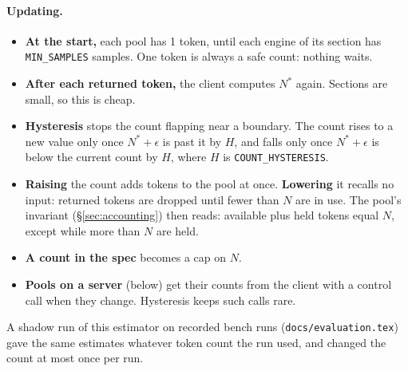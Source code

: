 \documentclass[11pt]{article}
\newcommand{\code}[1]{\texttt{#1}}
\begin{document}
\paragraph{Updating.}
\begin{itemize}[nosep]
  \item \textbf{At the start,} each pool has 1 token, until each engine of
        its section has \code{MIN\_SAMPLES} samples. One token is always a
        safe count: nothing waits.
  \item \textbf{After each returned token,} the client computes $N^*$
        again. Sections are small, so this is cheap.
  \item \textbf{Hysteresis} stops the count flapping near a boundary. The
        count rises to a new value only once $N^* + \epsilon$ is past it by
        $H$, and falls only once $N^* + \epsilon$ is below the current count
        by $H$, where $H$ is \code{COUNT\_HYSTERESIS}.
  \item \textbf{Raising} the count adds tokens to the pool at once.
        \textbf{Lowering} it recalls no input: returned tokens are dropped
        until fewer than $N$ are in use. The pool's invariant
        (\S\ref{sec:accounting}) then reads: available plus held tokens
        equal $N$, except while more than $N$ are held.
  \item \textbf{A count in the spec} becomes a cap on $N$.
  \item \textbf{Pools on a server} (below) get their counts from the client
        with a control call when they change. Hysteresis keeps such calls
        rare.
\end{itemize}
A shadow run of this estimator on recorded bench runs
(\code{docs/evaluation.tex}) gave the same estimates whatever token count the
run used, and changed the count at most once per run.
\end{document}
